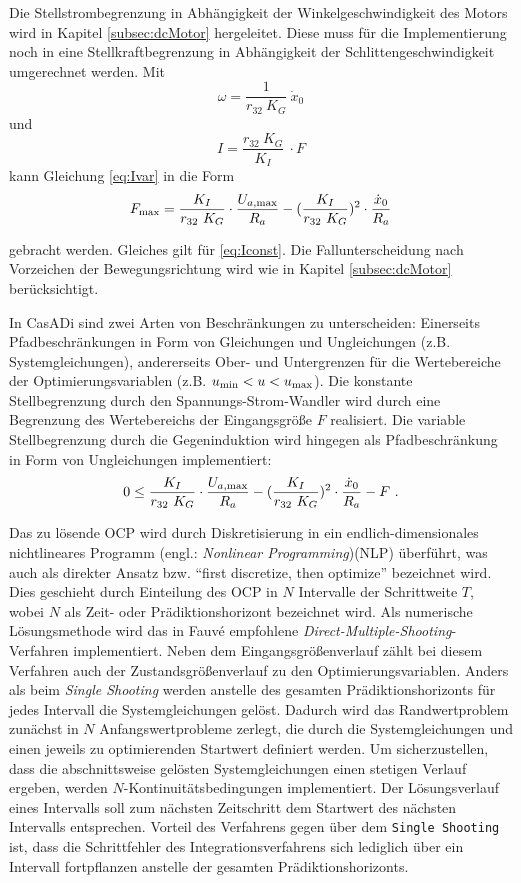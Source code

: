 Die Stellstrombegrenzung in Abhängigkeit der Winkelgeschwindigkeit des Motors wird in Kapitel \ref{subsec:dcMotor} hergeleitet. Diese muss für die Implementierung noch in eine Stellkraftbegrenzung in Abhängigkeit der Schlittengeschwindigkeit umgerechnet werden.
Mit 
	\[
	\omega = \frac{1}{r_{32}\ K_G} \ \dot{x}_0 
\]
und 
	\[
	I = \frac{r_{32}\ K_G}{K_I} \ \cdot F
\]
kann Gleichung \eqref{eq:Ivar} in die Form
	\[
	F_{\mathrm{max}} = \frac{K_I}{r_{32}\ K_G} \cdot \frac{U_{a\mathrm{,max}}}{R_a} - (\frac{K_I}{r_{32}\ K_G})^2 \cdot \frac{\dot{x}_0}{R_a}
\]

gebracht werden. Gleiches gilt für \eqref{eq:Iconst}. Die Fallunterscheidung nach Vorzeichen der Bewegungsrichtung wird wie in Kapitel \ref{subsec:dcMotor} berücksichtigt. 

In CasADi sind zwei Arten von Beschränkungen zu unterscheiden: Einerseits Pfadbeschränkungen in Form von Gleichungen und Ungleichungen (z.B. Systemgleichungen), andererseits Ober- und Untergrenzen für die Wertebereiche der Optimierungsvariablen (z.B. $u_{\mathrm{min}}<u<u_{\mathrm{max}}$). Die konstante Stellbegrenzung durch den Spannungs-Strom-Wandler wird durch eine Begrenzung des Wertebereichs der Eingangsgröße $F$ realisiert. Die variable Stellbegrenzung durch die Gegeninduktion wird hingegen als Pfadbeschränkung in Form von Ungleichungen implementiert:
\[
	 0 \leq \frac{K_I}{r_{32}\ K_G} \cdot \frac{U_{a\mathrm{,max}}}{R_a} - (\frac{K_I}{r_{32}\ K_G})^2 \cdot \frac{\dot{x}_0}{R_a} - F \ .
\]

Das zu lösende OCP wird durch Diskretisierung in ein endlich-dimensionales nichtlineares Programm (engl.: \textit{Nonlinear Programming})(NLP) überführt, was auch als direkter Ansatz bzw. "`first discretize, then optimize"' bezeichnet wird. Dies geschieht durch Einteilung des OCP in $N$ Intervalle der Schrittweite $T$, wobei $N$ als Zeit- oder Prädiktionshorizont bezeichnet wird. Als numerische Lösungsmethode wird das in Fauvé \cite{fauve} empfohlene \textit{Direct-Multiple-Shooting}-Verfahren implementiert. Neben dem Eingangsgrößenverlauf zählt bei diesem Verfahren auch der Zustandsgrößenverlauf zu den Optimierungsvariablen. Anders als beim \textit{Single Shooting} werden anstelle des gesamten Prädiktionshorizonts für jedes Intervall die Systemgleichungen gelöst. Dadurch wird das Randwertproblem zunächst in $N$ Anfangswertprobleme zerlegt, die durch die Systemgleichungen und einen jeweils zu optimierenden Startwert definiert werden. Um sicherzustellen, dass die abschnittsweise gelösten Systemgleichungen einen stetigen Verlauf ergeben, werden $N$-Kontinuitätsbedingungen implementiert. Der Lösungsverlauf eines Intervalls soll zum nächsten Zeitschritt dem Startwert des nächsten Intervalls entsprechen. Vorteil des Verfahrens gegen über dem \texttt{Single Shooting} ist, dass die Schrittfehler des Integrationsverfahrens sich lediglich über ein Intervall fortpflanzen anstelle der gesamten Prädiktionshorizonts.

